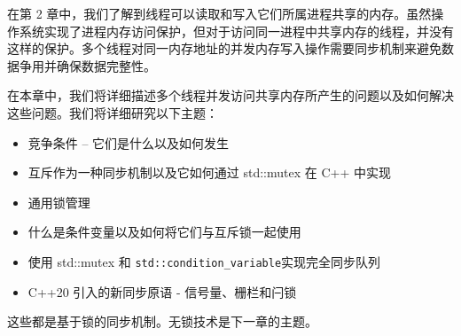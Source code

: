 在第 2 章中，我们了解到线程可以读取和写入它们所属进程共享的内存。虽然操作系统实现了进程内存访问保护，但对于访问同一进程中共享内存的线程，并没有这样的保护。多个线程对同一内存地址的并发内存写入操作需要同步机制来避免数据争用并确保数据完整性。

在本章中，我们将详细描述多个线程并发访问共享内存所产生的问题以及如何解决这些问题。我们将详细研究以下主题：

\begin{itemize}
\item
竞争条件 – 它们是什么以及如何发生

\item
互斥作为一种同步机制以及它如何通过 std::mutex 在 C++ 中实现

\item
通用锁管理

\item
什么是条件变量以及如何将它们与互斥锁一起使用

\item
使用 std::mutex 和 \verb|std::condition_variable|实现完全同步队列

\item
C++20 引入的新同步原语 - 信号量、栅栏和闩锁
\end{itemize}

这些都是基于锁的同步机制。无锁技术是下一章的主题。

